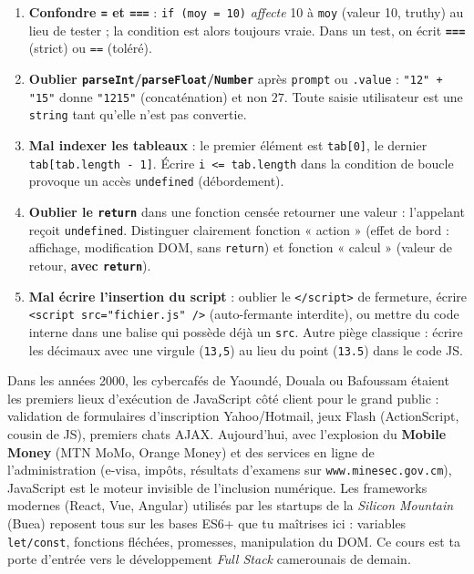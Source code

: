 \documentclass[11pt]{article}
\begin{document}
\begin{attention}
\begin{enumerate}
\item \textbf{Confondre \texttt{=} et \texttt{===}} : \texttt{if (moy = 10)} \emph{affecte} 10 à \texttt{moy} (valeur 10, truthy) au lieu de tester ; la condition est alors toujours vraie. Dans un test, on écrit \textbf{\texttt{===}} (strict) ou \texttt{==} (toléré).
\item \textbf{Oublier \texttt{parseInt}/\texttt{parseFloat}/\texttt{Number}} après \texttt{prompt} ou \texttt{.value} : \texttt{"12" + "15"} donne \texttt{"1215"} (concaténation) et non $27$. Toute saisie utilisateur est une \texttt{string} tant qu'elle n'est pas convertie.
\item \textbf{Mal indexer les tableaux} : le premier élément est \texttt{tab[0]}, le dernier \texttt{tab[tab.length - 1]}. Écrire \texttt{i <= tab.length} dans la condition de boucle provoque un accès \texttt{undefined} (débordement).
\item \textbf{Oublier le \texttt{return}} dans une fonction censée retourner une valeur : l'appelant reçoit \texttt{undefined}. Distinguer clairement fonction « action » (effet de bord : affichage, modification DOM, sans \texttt{return}) et fonction « calcul » (valeur de retour, \textbf{avec \texttt{return}}).
\item \textbf{Mal écrire l'insertion du script} : oublier le \texttt{</script>} de fermeture, écrire \texttt{<script src="fichier.js" />} (auto-fermante interdite), ou mettre du code interne dans une balise qui possède déjà un \texttt{src}. Autre piège classique : écrire les décimaux avec une virgule (\texttt{13,5}) au lieu du point (\texttt{13.5}) dans le code JS.
\end{enumerate}
\end{attention}

\begin{savaistu}
Dans les années 2000, les cybercafés de Yaoundé, Douala ou Bafoussam étaient les premiers lieux d'exécution de JavaScript côté client pour le grand public : validation de formulaires d'inscription Yahoo/Hotmail, jeux Flash (ActionScript, cousin de JS), premiers chats AJAX. Aujourd'hui, avec l'explosion du \textbf{Mobile Money} (MTN MoMo, Orange Money) et des services en ligne de l'administration (e-visa, impôts, résultats d'examens sur \texttt{www.minesec.gov.cm}), JavaScript est le moteur invisible de l'inclusion numérique. Les frameworks modernes (React, Vue, Angular) utilisés par les startups de la \emph{Silicon Mountain} (Buea) reposent tous sur les bases ES6+ que tu maîtrises ici : variables \texttt{let/const}, fonctions fléchées, promesses, manipulation du DOM. Ce cours est ta porte d'entrée vers le développement \emph{Full Stack} camerounais de demain.
\end{savaistu}
\end{document}
